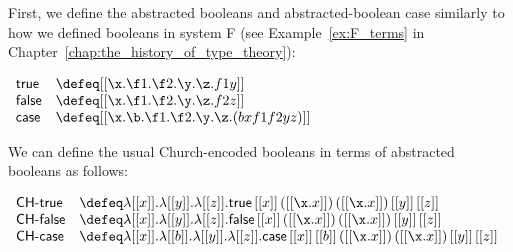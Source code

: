 \begin{example}
  \label{ex:FS-syn-red-case}
  First, we define the abstracted booleans and abstracted-boolean case
  similarly to how we defined booleans in system F (see
  Example~\ref{ex:F_terms} in
  Chapter~\ref{chap:the_history_of_type_theory}):
  \begin{center}
    \small
    \begin{math}
      \begin{array}{lll}
        \mathsf{true}     & \defeq [[\x.\f1.\f2.\y.\z.f1 y]]\\
        \mathsf{false}    & \defeq [[\x.\f1.\f2.\y.\z.f2 z]]\\
        \mathsf{case}     & \defeq [[\x.\b.\f1.\f2.\y.\z.(b x f1 f2 y z)]]\\
      \end{array}
    \end{math}
  \end{center}
  We can define the usual Church-encoded booleans in terms of
  abstracted booleans as follows:
  \begin{center}
    \small
    \begin{math}
      \begin{array}{lll}
        \textsf{CH-true}  & \defeq \lambda [[x]].\lambda [[y]].\lambda [[z]].\mathsf{true}\,[[x]]\,([[\x.x]])\,([[\x.x]])\,[[y]]\,[[z]]\\
        \textsf{CH-false} & \defeq \lambda [[x]].\lambda [[y]].\lambda [[z]].\mathsf{false}\,[[x]]\,([[\x.x]])\,([[\x.x]])\,[[y]]\,[[z]]\\
        \textsf{CH-case}  & \defeq \lambda [[x]].\lambda [[b]].\lambda [[y]].\lambda [[z]].\mathsf{case}\,[[x]]\,[[b]]\,([[\x.x]])\,([[\x.x]])\,[[y]]\,[[z]]\\
      \end{array}
    \end{math}
  \end{center}


\end{example}
